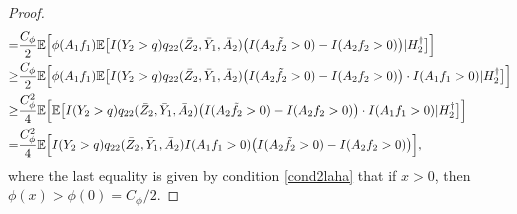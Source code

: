 \documentclass[10pt]{article}
\theoremstyle{remark} \newtheorem{rem}{Remark}
\begin{document}
\begin{proof}
\begin{align}
        =& \frac{C_\phi}{2}\mathbb{E}\Big[\phi(A_1f_1)\mathbb{E}\big[I(Y_2>q)q_{22}(\bar Z_{2}, \bar Y_{1}, \bar A_{2}) \big(I(A_2\tilde f_2>0)-I(A_2f_2>0)\big)|H_2^\dag\big] \Big] \notag\\
        \geq& \frac{C_\phi}{2}\mathbb{E}\Big[\phi(A_1f_1)\mathbb{E}\big[I(Y_2>q)q_{22}(\bar Z_{2}, \bar Y_{1}, \bar A_{2}) \big(I(A_2\tilde f_2>0)-I(A_2f_2>0)\big) \cdot I(A_1f_1>0)|H_2^\dag\big] \Big] \notag\\
        \geq& \frac{C_\phi^2}{4}\mathbb{E}\Big[\mathbb{E}\big[I(Y_2>q)q_{22}(\bar Z_{2}, \bar Y_{1}, \bar A_{2}) \big(I(A_2\tilde f_2>0)-I(A_2f_2>0)\big) \cdot I(A_1f_1>0)|H_2^\dag\big] \Big] \notag\\
        =& \frac{C_\phi^2}{4}\mathbb{E} \Big[I(Y_2>q)q_{22}(\bar Z_{2}, \bar Y_{1}, \bar A_{2}) I(A_1f_1>0) \big(I(A_2\tilde f_2>0)-I(A_2f_2>0)\big)\Big], \label{firstterm}
    \end{align}
    where the last equality is given by condition \ref{cond2laha} that if $x>0$, then $\phi(x)>\phi(0)=C_\phi/2$.
    

\end{proof}
\end{document}
